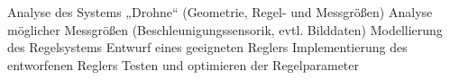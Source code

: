 



Analyse des Systems „Drohne“ (Geometrie, Regel- und Messgrößen)
Analyse möglicher Messgrößen (Beschleunigungssensorik, evtl. Bilddaten)
Modellierung des Regelsystems
Entwurf eines geeigneten Reglers
Implementierung des entworfenen Reglers
Testen und optimieren der Regelparameter

